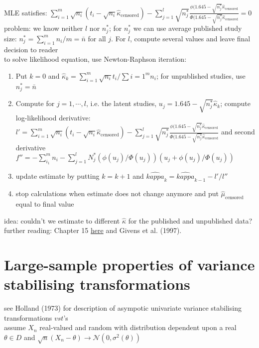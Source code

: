 MLE satisfies: $\sum\limits_{i=1}^m \sqrt{n_i}(t_i - \sqrt{n_i}\hat{\kappa}_\text{censored}) - \sum\limits_{j=1}^l \sqrt{n_j^*} \frac{\phi(1.645-\sqrt{n_j^*}\hat{\kappa}_\text{censored}}{\Phi(1.645-\sqrt{n_j^*}\hat{\kappa}_\text{censored}} = 0$\\

problem: we know neither $l$ nor $n_j^*$; for $n_j^*$ we can use average published study size: $n_j^* = \sum\limits_{i=1}^m n_i/m = \bar{n}$ for all $j$. For $l$, compute several values and leave final decision to reader\\

to solve likelihood equation, use Newton-Raphson iteration:
\begin{enumerate}
    \item Put $k=0$ and $\hat{\kappa}_k = \sum\limits_{i=1}^m \sqrt{n_i}t_i/\sum\limits{i=1}^m n_i$; for unpublished studies, use $n_j^* = \bar{n}$
    \item Compute for $j=1,\cdots,l$, i.e. the latent studies, $u_j = 1.645-\sqrt{n_j^*}\hat{\kappa}_k$; compute log-likelihood derivative: $l' = \sum\limits_{i=1}^m \sqrt{n_i}(t_i - \sqrt{n_i}\hat{\kappa}_\text{censored}) - \sum\limits_{j=1}^l \sqrt{n_j^*} \frac{\phi(1.645-\sqrt{n_j^*}\hat{\kappa}_\text{censored}}{\Phi(1.645-\sqrt{n_j^*}\hat{\kappa}_\text{censored}}$ and second derivative $f'' = -\sum\limits_{i_1}^m n_i - \sum\limits_{j=1}^l N_j^* (\phi(u_j)/\Phi(u_j))(u_j + \phi(u_j)/\Phi(u_j))$
    \item update estimate by putting $k=k+1$ and $\hat{kappa}_k = \hat{kappa}_{k-1}-l'/l''$
    \item stop calculations when estimate does not change anymore and put $\hat{\mu}_\text{censored}$ equal to final value
\end{enumerate}

idea: couldn't we estimate to different $\hat{\kappa}$ for the published and unpublished data?\\

further reading: Chapter 15 \href{http://www.cochrane_net.org/openlearning}{here} and Givens et al. (1997).

\section{Large-sample properties of variance stabilising transformations}
see Holland (1973) for description of asympotic univariate variance stabilising transformations $vst$'s\\
assume $X_n$ real-valued and random with distribution dependent upon a real $\theta \in D$ and $\sqrt{n}(X_n - \theta) \rightarrow \mathcal{N}(0,\sigma^2(\theta))$\\

